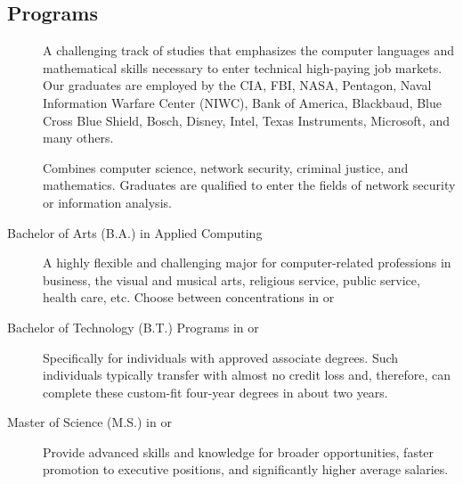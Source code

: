 \subsection{Programs}
\begin{description}
	\item[] A challenging track of studies that emphasizes the computer languages and mathematical skills necessary to enter technical high-paying job markets. Our graduates are employed by the CIA, FBI, NASA, Pentagon, Naval Information Warfare Center (NIWC), Bank of America, Blackbaud, Blue Cross Blue Shield, Bosch, Disney, Intel, Texas Instruments, Microsoft, and many others.

	\item[] Combines computer science, network security, criminal justice, and mathematics. Graduates are qualified to enter the fields of network security or information analysis.

	\item[Bachelor of Arts (B.A.) in Applied Computing\screenrefHSpace{}] A highly flexible and challenging major for computer-related professions in business, the visual and musical arts, religious service, public service, health care, etc. Choose between concentrations in   or 

	\item[Bachelor of Technology (B.T.) Programs in  or \screenrefHSpace{}] Specifically for individuals with approved associate degrees. Such individuals typically transfer with almost no credit loss and, therefore, can complete these custom-fit four-year degrees in about two years.

	\item[Master of Science (M.S.) in  or \screenrefHSpace{}] Provide advanced skills and knowledge for broader opportunities, faster promotion to executive positions, and significantly higher average salaries.%
\end{description}

